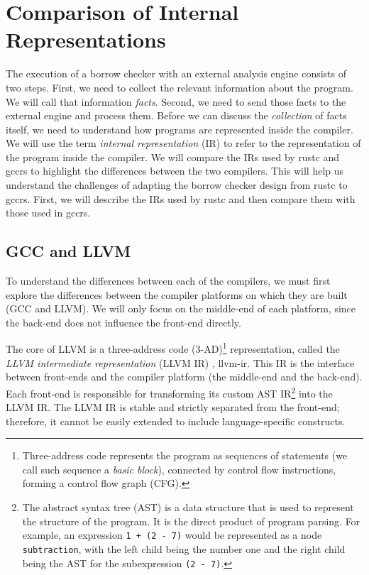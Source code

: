 \documentclass[
  11pt,
  twoside,symmetric]{report}
\begin{document}
\chapter{Comparison of Internal
Representations}\label{comparison-of-internal-representations}

The execution of a borrow checker with an external analysis engine
consists of two steps. First, we need to collect the relevant
information about the program. We will call that information
\emph{facts}. Second, we need to send those facts to the external engine
and process them. Before we can discuss the \emph{collection} of facts
itself, we need to understand how programs are represented inside the
compiler. We will use the term \emph{internal representation} (IR) to
refer to the representation of the program inside the compiler. We will
compare the IRs used by rustc and gccrs to highlight the differences
between the two compilers. This will help us understand the challenges
of adapting the borrow checker design from rustc to gccrs. First, we
will describe the IRs used by rustc and then compare them with those
used in gccrs.

\section{GCC and LLVM}\label{gcc-and-llvm}

To understand the differences between each of the compilers, we must
first explore the differences between the compiler platforms on which
they are built (GCC and LLVM). We will only focus on the middle-end of
each platform, since the back-end does not influence the front-end
directly.

The core of LLVM is a three-address code (3-AD)\footnote{Three-address
  code represents the program as sequences of statements (we call such
  sequence a \emph{basic block}), connected by control flow
  instructions, forming a control flow graph (CFG).} representation,
called the \emph{LLVM intermediate representation} (LLVM IR)
, llvm-ir. This IR is the interface between
front-ends and the compiler platform (the middle-end and the back-end).
Each front-end is responsible for transforming its custom AST
IR\footnote{The abstract syntax tree (AST) is a data structure that is
  used to represent the structure of the program. It is the direct
  product of program parsing. For example, an expression
  \texttt{1\ +\ (2\ -\ 7)} would be represented as a node
  \texttt{subtraction}, with the left child being the number one and the
  right child being the AST for the subexpression \texttt{(2\ -\ 7)}.}
into the LLVM IR. The LLVM IR is stable and strictly separated from the
front-end; therefore, it cannot be easily extended to include
language-specific constructs.
\end{document}
